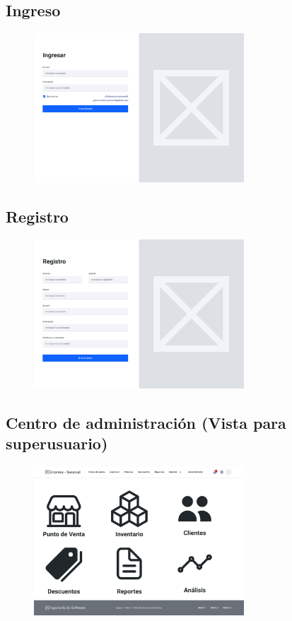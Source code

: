 \documentclass{article}
\begin{document}
\subsection{Ingreso}
\begin{figure}[h]
\centering
\includegraphics[width=0.7\textwidth]{wireframe/Ingreso.png}
\end{figure}

\subsection{Registro}
\begin{figure}[h]
\centering
\includegraphics[width=0.7\textwidth]{wireframe/Registro.png}
\end{figure}

\newpage
\subsection{Centro de administraci\'on (Vista para superusuario)}
\begin{figure}[h]
\centering
\includegraphics[width=0.7\textwidth]{wireframe/Centro Administrador.png}
\end{figure}
\end{document}
